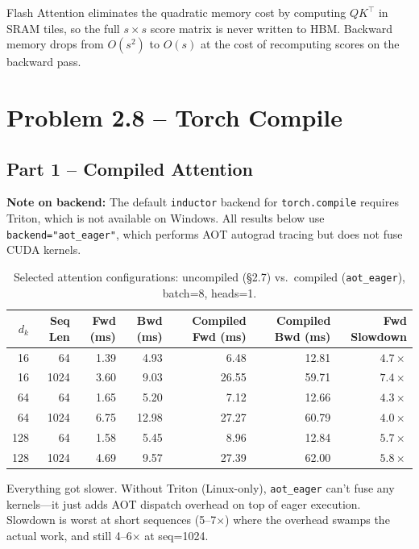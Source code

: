 \documentclass[11pt]{article}
\begin{document}
Flash Attention eliminates the quadratic memory cost by computing $QK^\top$ in SRAM tiles, so the full $s \times s$ score matrix is never written to HBM. Backward memory drops from $O(s^2)$ to $O(s)$ at the cost of recomputing scores on the backward pass.


\section{Problem 2.8 -- Torch Compile}

\subsection*{Part 1 -- Compiled Attention}

\textbf{Note on backend:} The default \texttt{inductor} backend for \texttt{torch.compile} requires Triton, which is not available on Windows. All results below use \texttt{backend="aot\_eager"}, which performs AOT autograd tracing but does not fuse CUDA kernels.

\begin{table}[h]
\centering
\small
\begin{tabular}{rrrrrrr}
\toprule
$d_k$ & Seq Len & Fwd (ms) & Bwd (ms) & Compiled Fwd (ms) & Compiled Bwd (ms) & Fwd Slowdown \\
\midrule
16  &   64 &  1.39 &  4.93 &  6.48 & 12.81 & $4.7\times$ \\
16  & 1024 &  3.60 &  9.03 & 26.55 & 59.71 & $7.4\times$ \\
64  &   64 &  1.65 &  5.20 &  7.12 & 12.66 & $4.3\times$ \\
64  & 1024 &  6.75 & 12.98 & 27.27 & 60.79 & $4.0\times$ \\
128 &   64 &  1.58 &  5.45 &  8.96 & 12.84 & $5.7\times$ \\
128 & 1024 &  4.69 &  9.57 & 27.39 & 62.00 & $5.8\times$ \\
\bottomrule
\end{tabular}
\caption{Selected attention configurations: uncompiled (§2.7) vs.\ compiled (\texttt{aot\_eager}), batch=8, heads=1.}
\end{table}

Everything got slower. Without Triton (Linux-only), \texttt{aot\_eager} can't fuse any kernels---it just adds AOT dispatch overhead on top of eager execution. Slowdown is worst at short sequences (5--7$\times$) where the overhead swamps the actual work, and still 4--6$\times$ at seq=1024.
\end{document}
